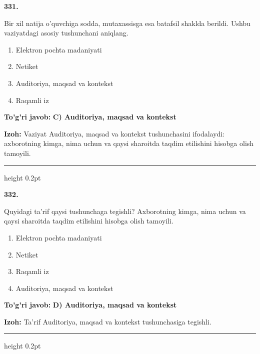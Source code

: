 \documentclass[10pt,a4paper,oneside]{article}
\begin{document}
\noindent\textbf{\color{ink}331.}
\par
Bir xil natija o'quvchiga sodda, mutaxassisga esa batafsil shaklda berildi. Ushbu vaziyatdagi asosiy tushunchani aniqlang.
\begin{enumerate}[label=\Alph*),leftmargin=9mm]
\item Elektron pochta madaniyati
\item Netiket
\item Auditoriya, maqsad va kontekst
\item Raqamli iz
\end{enumerate}
\begin{tcolorbox}[enhanced,breakable,colback=teal!4,colframe=teal!50!black,boxrule=0.5pt,arc=1.1mm,left=3mm,right=3mm,top=1.7mm,bottom=1.7mm,before skip=2mm,after skip=2mm]
\textbf{\color{teal}To'g'ri javob:} \textbf{C) Auditoriya, maqsad va kontekst}
\par\smallskip
\textbf{Izoh:} Vaziyat Auditoriya, maqsad va kontekst tushunchasini ifodalaydi: axborotning kimga, nima uchun va qaysi sharoitda taqdim etilishini hisobga olish tamoyili.
\end{tcolorbox}
\vspace{2mm}\hrule height 0.2pt \vspace{3mm}

\noindent\textbf{\color{ink}332.}
\par
Quyidagi ta'rif qaysi tushunchaga tegishli? Axborotning kimga, nima uchun va qaysi sharoitda taqdim etilishini hisobga olish tamoyili.
\begin{enumerate}[label=\Alph*),leftmargin=9mm]
\item Elektron pochta madaniyati
\item Netiket
\item Raqamli iz
\item Auditoriya, maqsad va kontekst
\end{enumerate}
\begin{tcolorbox}[enhanced,breakable,colback=teal!4,colframe=teal!50!black,boxrule=0.5pt,arc=1.1mm,left=3mm,right=3mm,top=1.7mm,bottom=1.7mm,before skip=2mm,after skip=2mm]
\textbf{\color{teal}To'g'ri javob:} \textbf{D) Auditoriya, maqsad va kontekst}
\par\smallskip
\textbf{Izoh:} Ta'rif Auditoriya, maqsad va kontekst tushunchasiga tegishli.
\end{tcolorbox}
\vspace{2mm}\hrule height 0.2pt \vspace{3mm}
\end{document}
